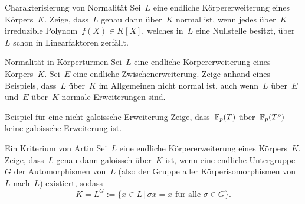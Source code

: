 \documentclass{algblatt}
\begin{document}

\begin{aufgabe}{4}{Charakterisierung von Normalität}
Sei~$L$ eine endliche Körpererweiterung eines Körpers~$K$. Zeige, dass~$L$
genau dann über~$K$ normal ist, wenn jedes über~$K$ irreduzible Polynom~$f(X)
\in K[X]$, welches in~$L$ eine Nullstelle besitzt, über~$L$ schon in
Linearfaktoren zerfällt.
\end{aufgabe}

\begin{aufgabe}{4}{Normalität in Körpertürmen}
Sei~$L$ eine endliche Körpererweiterung eines Körpers~$K$. Sei~$E$ eine
endliche Zwischenerweiterung. Zeige anhand eines Beispiels, dass~$L$ über~$K$
im Allgemeinen nicht normal ist, auch wenn~$L$ über~$E$ und~$E$ über~$K$
normale Erweiterungen sind.
\end{aufgabe}

\begin{aufgabe}{4}{Beispiel für eine nicht-galoissche Erweiterung}
Zeige, dass~$\mathbb{F}_p(T)$ über~$\mathbb{F}_p(T^p)$ keine galoissche Erweiterung ist.
\end{aufgabe}

\begin{aufgabe}{4}{Ein Kriterium von Artin}
Sei~$L$ eine endliche Körpererweiterung eines Körpers~$K$. Zeige, dass~$L$
genau dann galoissch über~$K$ ist, wenn eine endliche Untergruppe~$G$ der
Automorphismen von~$L$ (also der Gruppe aller Körperisomorphismen von~$L$
nach~$L$) existiert, sodass
\[ K = L^G := \{ x \in L \,|\, \text{$\sigma x = x$ für alle $\sigma \in G$}
\}. \]
\end{aufgabe}
\end{document}
